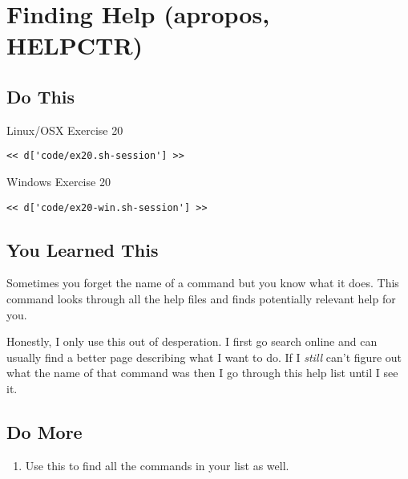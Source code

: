 \chapter{Finding Help (apropos, HELPCTR)}

\section{Do This}

\begin{code}{Linux/OSX Exercise 20}
\begin{Verbatim}
<< d['code/ex20.sh-session'] >>
\end{Verbatim}
\end{code}

\begin{code}{Windows Exercise 20}
\begin{Verbatim}
<< d['code/ex20-win.sh-session'] >>
\end{Verbatim}
\end{code}

\section{You Learned This}

Sometimes you forget the name of a command but you know what it does.  This command
looks through all the help files and finds potentially relevant help for you.

Honestly, I only use this out of desperation.  I first go search online and can
usually find a better page describing what I want to do.  If I \emph{still} can't
figure out what the name of that command was then I go through this help list
until I see it.

\section{Do More}

\begin{enumerate}
\item Use this to find all the commands in your list as well.
\end{enumerate}

